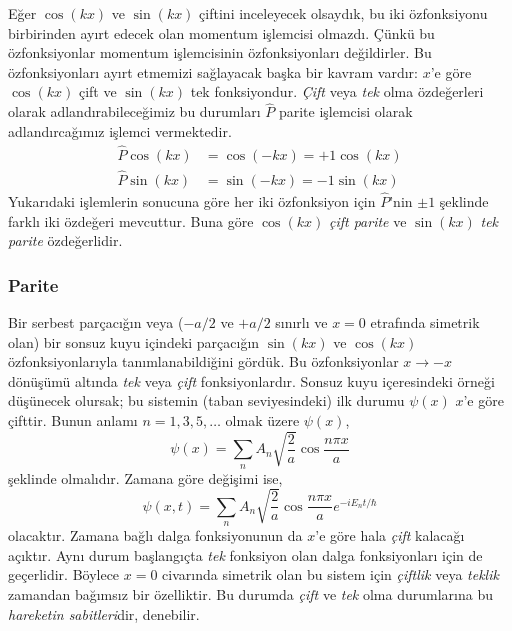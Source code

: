 \documentclass[a4paper,12pt, twoside]{article}
\begin{document}
Eğer $\cos(kx)$ ve $\sin(kx)$ çiftini inceleyecek olsaydık, bu iki özfonksiyonu birbirinden ayırt edecek olan momentum işlemcisi olmazdı. Çünkü bu özfonksiyonlar momentum işlemcisinin özfonksiyonları değildirler. Bu özfonksiyonları ayırt etmemizi sağlayacak başka bir kavram vardır: $x$'e göre $\cos(kx)$ çift ve $\sin(kx)$ tek fonksiyondur. \emph{Çift} veya \emph{tek} olma özdeğerleri olarak adlandırabileceğimiz bu durumları $\hat P$ parite işlemcisi olarak adlandırcağımız işlemci vermektedir.
\begin{align}
\hat P \cos( k x)&= \cos( - k x) = +1 \cos(k x)  \nonumber\\
\hat P \sin( k x)&= \sin( - k x) = -1 \sin(k x)
\end{align}
Yukarıdaki işlemlerin sonucuna göre her iki özfonksiyon için $\hat P$'nin $\pm 1$ şeklinde farklı iki özdeğeri mevcuttur. Buna göre $\cos(kx)$ \emph{çift parite} ve $\sin(kx)$ \emph{tek parite} özdeğerlidir.


\subsubsection{Parite}




Bir serbest parçacığın veya ($-a/2$ ve $+a/2$ sınırlı ve  $x=0$ etrafında simetrik olan) bir sonsuz kuyu içindeki parçacığın $\sin(kx)$ ve $\cos(kx)$ özfonksiyonlarıyla tanımlanabildiğini gördük. Bu özfonksiyonlar $x \rightarrow -x$ dönüşümü altında \emph{tek} veya \emph{çift} fonksiyonlardır.
Sonsuz kuyu içeresindeki örneği düşünecek olursak; bu sistemin (taban seviyesindeki) ilk durumu $\psi(x)$ $x$'e göre çifttir. Bunun anlamı $n=1,3,5,\ldots$ olmak üzere $\psi(x)$,
\begin{equation}
\psi(x)=\sum_{n} A_{n} \sqrt{\frac{2}{a}} \cos \frac{n \pi x}{a}
\end{equation}
şeklinde olmalıdır. Zamana göre değişimi ise,
\begin{equation}
\psi(x, t)=\sum_{n} A_{n} \sqrt{\frac{2}{a}} \cos \frac{n \pi x}{a} e^{-i E_{n} t / \hbar}
\end{equation}
olacaktır. Zamana bağlı dalga fonksiyonunun da $x$'e göre hala \emph{çift} kalacağı açıktır. Aynı durum başlangıçta \emph{tek} fonksiyon olan dalga fonksiyonları için de geçerlidir. Böylece $x=0$ civarında simetrik olan bu sistem için \emph{çiftlik} veya \emph{teklik} zamandan bağımsız bir özelliktir. Bu durumda \emph{çift} ve \emph{tek} olma durumlarına bu \emph{hareketin sabitleri}dir, denebilir. 
\end{document}

